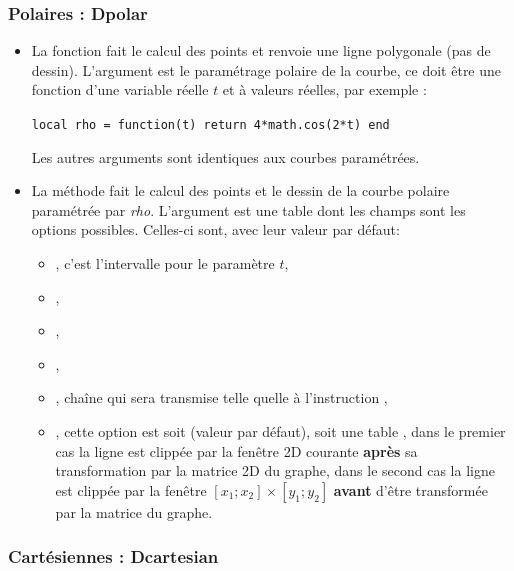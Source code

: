 \subsubsection{Polaires : Dpolar}

\begin{itemize}
\item La fonction  fait le calcul des points et renvoie une ligne polygonale (pas de dessin). L'argument  est le paramétrage polaire de la courbe, ce doit être une fonction d'une variable réelle $t$ et à valeurs réelles, par exemple :

    \texttt{local rho = function(t) return 4*math.cos(2*t) end}

    Les autres arguments sont identiques aux courbes paramétrées.
\item La méthode  fait le calcul des points et le  dessin de la courbe polaire paramétrée par \emph{rho}. L'argument  est une table dont les champs sont les options possibles. Celles-ci sont, avec leur valeur par défaut:

  \begin{itemize}
      \item {}, c'est l'intervalle pour le paramètre $t$,
      \item {}, 
      \item {},
      \item {},
      \item {},  chaîne qui sera transmise telle quelle à l'instruction \drawcmd,
      \item {}, cette option est soit \nil (valeur par défaut), soit une table , dans le premier cas la ligne est clippée par la fenêtre 2D courante \textbf{après} sa transformation par la matrice 2D du graphe, dans le second cas la ligne est clippée par la fenêtre $[x_1;x_2]\times[y_1;y_2]$ \textbf{avant} d'être transformée par la matrice du graphe.
  \end{itemize}
\end{itemize}

\subsubsection{Cartésiennes : Dcartesian}

